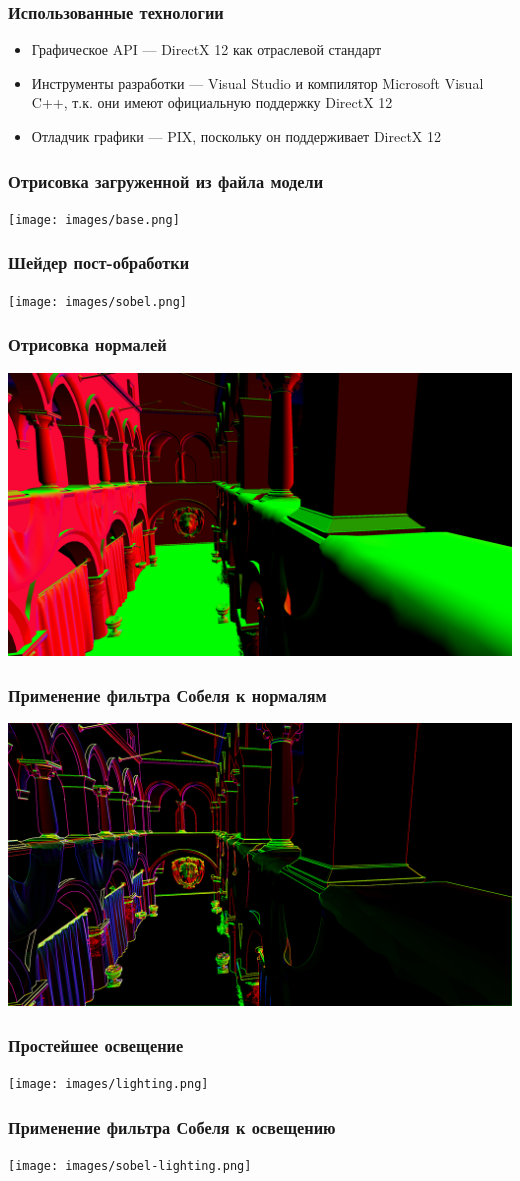 \begin{frame}
    \frametitle{Использованные технологии}
    \begin{itemize}
        \item Графическое API --- DirectX 12 как отраслевой стандарт
        \item Инструменты разработки --- Visual Studio
        и компилятор Microsoft Visual C++,
        т.к. они имеют официальную поддержку DirectX 12
        \item Отладчик графики --- PIX,
        поскольку он поддерживает DirectX 12
    \end{itemize}
\end{frame}

\begin{frame}
    \frametitle{Отрисовка загруженной из файла модели}
    \texttt{[image: images/base.png]}
\end{frame}

\begin{frame}
    \frametitle{Шейдер пост-обработки}
    \texttt{[image: images/sobel.png]}
\end{frame}

\begin{frame}
    \frametitle{Отрисовка нормалей}
    \includegraphics[width=\textwidth]{images/norm.png}
\end{frame}

\begin{frame}
    \frametitle{Применение фильтра Собеля к нормалям}
    \includegraphics[width=\textwidth]{images/sobel-norm.png}
\end{frame}

\begin{frame}
    \frametitle{Простейшее освещение}
    \texttt{[image: images/lighting.png]}
\end{frame}

\begin{frame}
    \frametitle{Применение фильтра Собеля к освещению}
    \texttt{[image: images/sobel-lighting.png]}
\end{frame}
